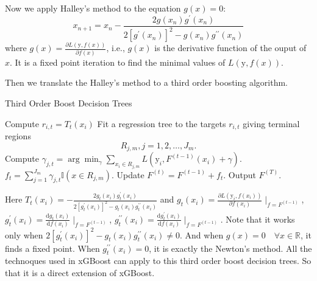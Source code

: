 \documentclass[UTF8]{article}
\begin{document}
Now we apply Halley's method to the equation $g(x)=0$:
\begin{equation}
x_{n+1}=x_n-\frac{2g(x_n)g^{\prime}(x_n)}{2[g^{\prime}(x_n)]^2 - g(x_n)g^{\prime\prime}(x_n)}
\end{equation} 
where $g(x)=\frac{\partial L(\mathrm{y}, f(x))}{\partial f(x)}$, i.e., $g(x)$ is the derivative function of the ouput of $x$. It is a fixed point iteration to find the minimal values of $L(\mathrm{y}, f(x))$.

Then we translate the Halley's method to a third order boosting algorithm.

\begin{algorithm}[h]
  \caption{Third Order Boost Decision Trees}
  \begin{algorithmic}[1]
  \STATE Compute $r_{i,t}=T_t(x_i)$
  \ENDFOR
  \STATE  Fit a regression tree to the targets $r_{i,t}$   giving terminal regions
     $$R_{j,m}, j = 1, 2,\dots , J_m. $$
  \label{code: TrainBase:getc}
  \STATE  Compute $\gamma_{j,t}=\arg\min_{\gamma}\sum_{x_i\in R_{j,m}}{L(\mathrm{y}_i, F^{(t-1)}(x_i)+\gamma)}$.
  \ENDFOR
  \STATE  $f_t={\sum}_{j=1}^{J_m}{\gamma}_{j, t} \mathbb{I}(x\in R_{j, m})$.
  \STATE Update $F^{(t)} = F^{(t-1)}+ f_t$.
  \ENDFOR
  \STATE Output $F^{(T)}$.
  \end{algorithmic}
\end{algorithm}
Here $T_t(x_i)=-\frac{2g_t(x_i)g_t^{\prime}(x_i)}{2[g_t^{\prime}(x_i)]^2 - g_t(x_i)g_t^{\prime\prime}(x_i)}$ and
$g_t(x_i)=\frac{\partial L(\mathrm{y}_i, f(x_i))}{\partial f(x_i)}\mid_{f=F^{(t-1)}}$,
$g_t^{\prime}(x_i)=\frac{\mathrm d g_t(x_i)}{\mathrm d  f(x_i)}\mid_{f=F^{(t-1)}}$,
$g_t^{\prime\prime}(x_i)=\frac{\mathrm d g_t^{\prime}(x_i)}{\mathrm d  f(x_i)}\mid_{f=F^{(t-1)}}$.
Note that it works only when $2[g_t^{\prime}(x_i)]^2 - g_t(x_i)g_t^{\prime\prime}(x_i)\not=0$. And when $g(x)=0\quad\forall x\in\mathbb{R}$, it finds a fixed point.
When $g_t^{\prime\prime}(x_i)=0$, it is exactly the Newton's method.
All the technoques used in xGBoost can apply to this third order boost decision trees.
So that it is a direct extension of xGBoost.
\end{document}
